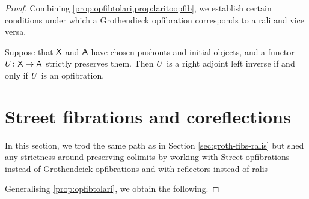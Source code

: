 \documentclass{amsart}
\begin{document}
\begin{proof}
%
% 

Combining \cref{prop:opfibtolari,prop:laritoopfib}, we establish certain conditions under which a Grothendieck opfibration corresponds to a rali and vice versa. %

\begin{thm}\label{thm:mainthm}
Suppose that $\mathsf{X}$ and $\mathsf{A}$ have chosen pushouts and initial objects, and a functor $U\colon\mathsf{X}\to\mathsf{A}$ strictly preserves them. Then $U$ is a right adjoint left inverse if and only if $U$ is an opfibration.
\end{thm}


\section{Street fibrations and coreflections}\label{Streetfibs}

In this section, we trod the same path as in Section \ref{sec:groth-fibs-ralis} but shed any strictness around preserving colimits by working with Street opfibrations instead of Grothendeick opfibrations and with reflectors instead of ralis

Generalising \cref{prop:opfibtolari}, we obtain the following. 


\end{proof}
\end{document}
